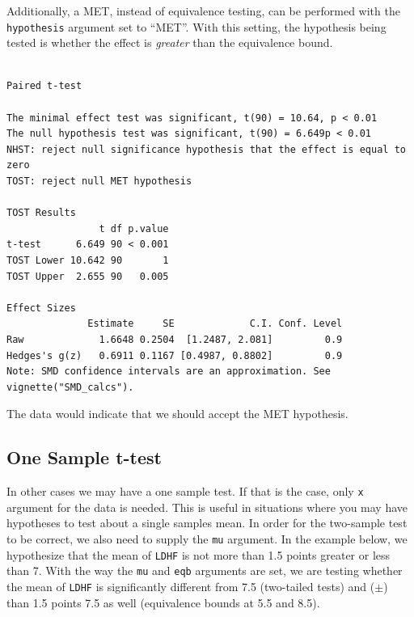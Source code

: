 \documentclass[
]{interact}
\newenvironment{Shaded}{\begin{snugshade}}{\end{snugshade}}
\newcommand{\AttributeTok}[1]{\textcolor[rgb]{0.40,0.45,0.13}{#1}}
\newcommand{\ConstantTok}[1]{\textcolor[rgb]{0.56,0.35,0.01}{#1}}
\newcommand{\DecValTok}[1]{\textcolor[rgb]{0.68,0.00,0.00}{#1}}
\newcommand{\FunctionTok}[1]{\textcolor[rgb]{0.28,0.35,0.67}{#1}}
\newcommand{\NormalTok}[1]{\textcolor[rgb]{0.00,0.23,0.31}{#1}}
\newcommand{\OtherTok}[1]{\textcolor[rgb]{0.00,0.23,0.31}{#1}}
\newcommand{\SpecialCharTok}[1]{\textcolor[rgb]{0.37,0.37,0.37}{#1}}
\newcommand{\StringTok}[1]{\textcolor[rgb]{0.13,0.47,0.30}{#1}}
\begin{document}
\newpage

Additionally, a MET, instead of equivalence testing, can be performed
with the \texttt{hypothesis} argument set to ``MET''. With this setting,
the hypothesis being tested is whether the effect is \emph{greater} than
the equivalence bound.

\begin{Shaded}
\end{Shaded}

\begin{verbatim}

Paired t-test

The minimal effect test was significant, t(90) = 10.64, p < 0.01
The null hypothesis test was significant, t(90) = 6.649p < 0.01
NHST: reject null significance hypothesis that the effect is equal to zero 
TOST: reject null MET hypothesis

TOST Results 
                t df p.value
t-test      6.649 90 < 0.001
TOST Lower 10.642 90       1
TOST Upper  2.655 90   0.005

Effect Sizes 
              Estimate     SE             C.I. Conf. Level
Raw             1.6648 0.2504  [1.2487, 2.081]         0.9
Hedges's g(z)   0.6911 0.1167 [0.4987, 0.8802]         0.9
Note: SMD confidence intervals are an approximation. See vignette("SMD_calcs").
\end{verbatim}

The data would indicate that we should accept the MET hypothesis.

\newpage

\hypertarget{one-sample-t-test}{%
\subsection{One Sample t-test}\label{one-sample-t-test}}

In other cases we may have a one sample test. If that is the case, only
\texttt{x} argument for the data is needed. This is useful in situations
where you may have hypotheses to test about a single samples mean. In
order for the two-sample test to be correct, we also need to supply the
\texttt{mu} argument. In the example below, we hypothesize that the mean
of \texttt{LDHF} is not more than 1.5 points greater or less than 7.
With the way the \texttt{mu} and \texttt{eqb} arguments are set, we are
testing whether the mean of \texttt{LDHF} is significantly different
from 7.5 (two-tailed tests) and (\(\pm\)) than 1.5 points 7.5 as well
(equivalence bounds at 5.5 and 8.5).
\end{document}
